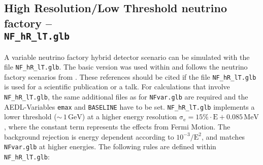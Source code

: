 \subsection*{High Resolution/Low Threshold neutrino factory -- \\{\tt NF\_hR\_lT.glb}}

A variable neutrino factory hybrid detector scenario can be simulated with the file {\tt NF\_hR\_lT.glb}. The basic version was
used within \cite{Huber:2006wb} and follows the neutrino factory scenarios from \cite{Huber:2002mx}. These
references should be cited if the file {\tt NF\_hR\_lT.glb} is used for a scientific publication or a talk.
For calculations that involve {\tt NF\_hR\_lT.glb}, the same additional files as for {\tt NFvar.glb} are
required and the {\sf AEDL}-Variables {\tt emax} and {\tt BASELINE} have to be set. {\tt NF\_hR\_lT.glb} 
implements a lower threshold ($\mathrm{\sim\,1\,GeV}$) at a higher energy resolution
$\mathrm{\sigma_e=15\%\cdot E + 0.085\, MeV}$, where the constant term represents 
the effects from Fermi Motion. The background rejection is energy dependent according to 
$10^{-3}/\mathrm{E^2}$, and matches {\tt NFvar.glb} at higher energies. The following rules are defined within {\tt NF\_hR\_lT.glb}: 
